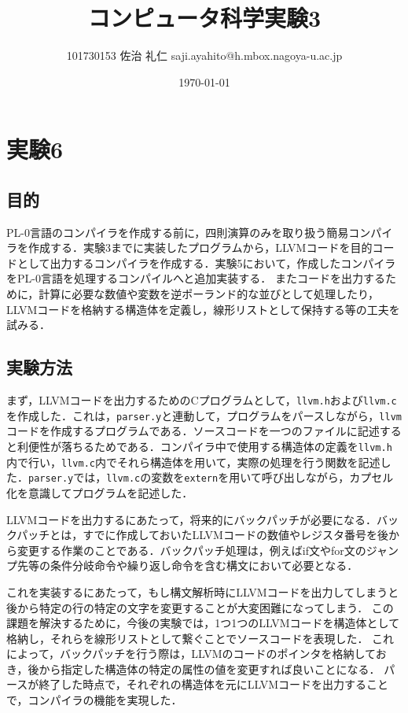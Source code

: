 \documentclass[uplatex]{jsarticle}
\title{コンピュータ科学実験3}
\author{101730153 佐治 礼仁 saji.ayahito@h.mbox.nagoya-u.ac.jp}
\date{\today}
\begin{document}
\maketitle
\newpage
\tableofcontents
\newpage
\section{実験6}
\subsection{目的}
PL-0言語のコンパイラを作成する前に，四則演算のみを取り扱う簡易コンパイラを作成する．実験3までに実装したプログラムから，LLVMコードを目的コードとして出力するコンパイラを作成する．実験5において，作成したコンパイラをPL-0言語を処理するコンパイルへと追加実装する．
またコードを出力するために，計算に必要な数値や変数を逆ポーランド的な並びとして処理したり，LLVMコードを格納する構造体を定義し，線形リストとして保持する等の工夫を試みる．
\subsection{実験方法}
まず，LLVMコードを出力するためのCプログラムとして，\verb#llvm.h#および\verb#llvm.c#を作成した．これは，\verb#parser.y#と連動して，プログラムをパースしながら，\verb#llvm#コードを作成するプログラムである．ソースコードを一つのファイルに記述すると利便性が落ちるためである．コンパイラ中で使用する構造体の定義を\verb#llvm.h#内で行い，\verb#llvm.c#内でそれら構造体を用いて，実際の処理を行う関数を記述した．\verb#parser.y#では，\verb#llvm.c#の変数を\verb#extern#を用いて呼び出しながら，カプセル化を意識してプログラムを記述した．

LLVMコードを出力するにあたって，将来的にバックパッチが必要になる．バックパッチとは，すでに作成しておいたLLVMコードの数値やレジスタ番号を後から変更する作業のことである．バックパッチ処理は，例えばif文やfor文のジャンプ先等の条件分岐命令や繰り返し命令を含む構文において必要となる．

これを実装するにあたって，もし構文解析時にLLVMコードを出力してしまうと後から特定の行の特定の文字を変更することが大変困難になってしまう．
この課題を解決するために，今後の実験では，1つ1つのLLVMコードを構造体として格納し，それらを線形リストとして繋ぐことでソースコードを表現した．
これによって，バックパッチを行う際は，LLVMのコードのポインタを格納しておき，後から指定した構造体の特定の属性の値を変更すれば良いことになる．
パースが終了した時点で，それぞれの構造体を元にLLVMコードを出力することで，コンパイラの機能を実現した．
\end{document}
